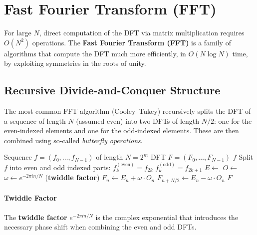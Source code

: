 \section{Fast Fourier Transform (FFT)}

For large $N$, direct computation of the DFT via matrix multiplication requires $O(N^2)$ operations. The \textbf{Fast Fourier Transform (FFT)} is a family of algorithms that compute the DFT much more efficiently, in $O(N \log N)$ time, by exploiting symmetries in the roots of unity.

\subsection{Recursive Divide-and-Conquer Structure}
The most common FFT algorithm (Cooley--Tukey) recursively splits the DFT of a sequence of length $N$ (assumed even) into two DFTs of length $N/2$: one for the even-indexed elements and one for the odd-indexed elements. These are then combined using so-called \emph{butterfly operations}.

\begin{algorithm}[H]
    \caption{Radix-2 Cooley--Tukey FFT Algorithm}
    \begin{algorithmic}[1]
        \Require Sequence $f = (f_0, \ldots, f_{N-1})$ of length $N = 2^m$
        \Ensure DFT $F = (F_0, \ldots, F_{N-1})$
        \State \Return $f$
        \Else
        \State Split $f$ into even and odd indexed parts:
        \State $f^{(\mathrm{even})}_k = f_{2k}$
        \State $f^{(\mathrm{odd})}_k = f_{2k+1}$
        \State $E \gets$ 
        \State $O \gets$ 
        \State $\omega \gets e^{-2\pi i n / N}$ \hfill (\textbf{twiddle factor})
        \State $F_n \gets E_n + \omega \cdot O_n$
        \State $F_{n+N/2} \gets E_n - \omega \cdot O_n$
        \EndFor
        \State \Return $F$
        \EndIf
        \EndFunction
    \end{algorithmic}
\end{algorithm}

\paragraph{Twiddle Factor}

The \textbf{twiddle factor} $e^{-2\pi i n / N}$ is the complex exponential that introduces the necessary phase shift when combining the even and odd DFTs.

